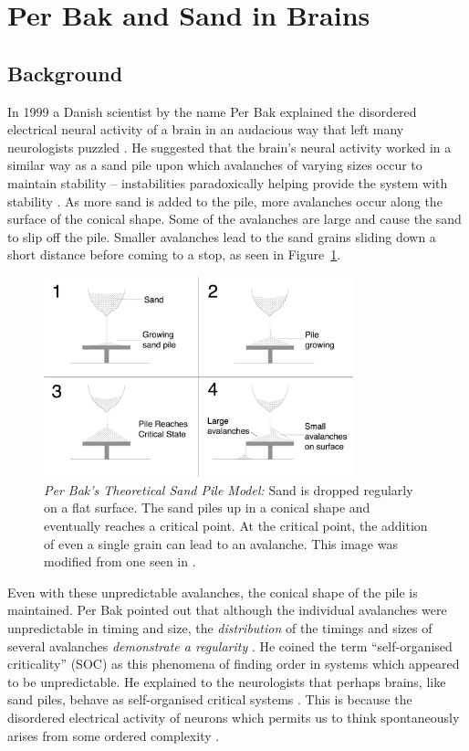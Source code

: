 \documentclass{book}
\begin{document}
\section{Per Bak and Sand in Brains}
\subsection{Background}
In 1999 a Danish scientist by the name Per Bak explained the disordered electrical neural activity of a brain in an audacious way that left many neurologists puzzled \cite{MindSandWeb}.  He suggested that the brain's neural activity worked in a similar way as a sand pile upon which avalanches of varying sizes occur to maintain stability -- instabilities paradoxically helping provide the system with stability \cite{MindSandWeb}. As more sand is added to the pile, more avalanches occur along the surface of the conical shape. Some of the avalanches are large and cause the sand to slip off the pile. Smaller avalanches lead to the sand grains sliding down a short distance before coming to a stop, as seen in Figure~\ref{fig:sandPileModel}. 

	\begin{figure}[h]
	\centering
	\includegraphics[width=0.8\textwidth]{Figures/Intro/SandPileFigs/sand_pile_model.png}
	\caption[Per Bak's Theoretical Sand Pile Model]{
		\textit{Per Bak's Theoretical Sand Pile Model:} Sand is dropped regularly on a flat surface. The sand piles up in a conical shape and eventually reaches a critical point. At the critical point, the addition of even a single grain can lead to an avalanche. This image was modified from one seen in \cite{IMGSandPile}.}
	\label{fig:sandPileModel}
\end{figure}

Even with these unpredictable avalanches, the conical shape of the pile is maintained. Per Bak pointed out that although the individual avalanches were unpredictable in timing and size, the \textit{distribution} of the timings and sizes of several avalanches \textit{demonstrate a regularity} \cite{OGperBak1987}. He coined the term ``self-organised criticality'' (SOC) as this phenomena of finding order in systems which appeared to be unpredictable.  He explained to the neurologists that perhaps brains, like sand piles, behave as self-organised critical systems \cite{MindSandWeb}. This is because the disordered electrical activity of neurons which permits us to think spontaneously arises from some ordered complexity \cite{MindSandWeb}. 
\end{document}
